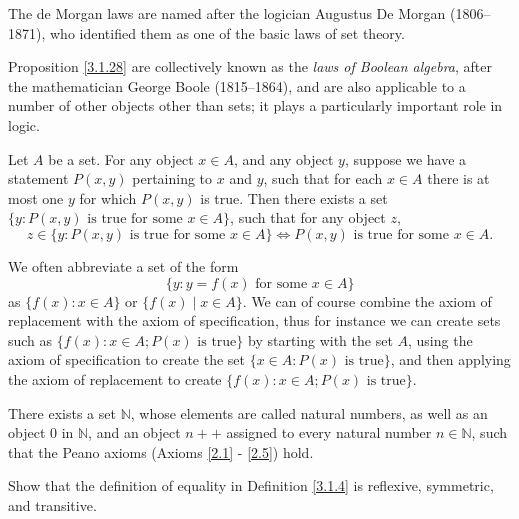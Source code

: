 \begin{remark}\label{3.1.29}
The de Morgan laws are named after the logician Augustus De Morgan (1806--1871), who identified them as one of the basic laws of set theory.
\end{remark}

\begin{remark}\label{3.1.30}
Proposition \ref{3.1.28} are collectively known as the \emph{laws of Boolean algebra}, after the mathematician George Boole (1815–1864), and are also applicable to a number of other objects other than sets;
it plays a particularly important role in logic.
\end{remark}

\begin{axiom}[Replacement]\label{3.6}
Let \(A\) be a set.
For any object \(x \in A\), and any object \(y\), suppose we have a statement \(P(x, y)\) pertaining to \(x\) and \(y\), such that for each \(x \in A\) there is at most one \(y\) for which \(P(x, y)\) is true.
Then there exists a set \(\{y : P(x, y) \text{ is true for some } x \in A\}\), such that for any object \(z\),
\[
    z \in \{y: P(x, y) \text{ is true for some } x \in A\} \iff P(x, y) \text{ is true for some } x \in A.
\]
\end{axiom}

\begin{note}
We often abbreviate a set of the form
\[
    \{y : y = f(x) \text{ for some } x \in A\}
\]
as \(\{f(x) : x \in A\}\) or \(\{f(x) \mid x \in A\}\).
We can of course combine the axiom of replacement with the axiom of specification, thus for instance we can create sets such as \(\{f(x) : x \in A; P(x) \text{ is true}\}\) by starting with the set \(A\), using the axiom of specification to create the set \(\{x \in A : P(x) \text{ is true}\}\), and then applying the axiom of replacement to create \(\{f(x) : x \in A; P(x) \text{ is true}\}\).
\end{note}

\begin{axiom}[Infinity]\label{3.7}
There exists a set \(\mathds{N}\), whose elements are called natural numbers, as well as an object \(0\) in \(\mathds{N}\), and an object \(n++\) assigned to every natural number \(n \in \mathds{N}\), such that the Peano axioms (Axioms \ref{2.1} - \ref{2.5}) hold.
\end{axiom}

\exercisesection

\begin{exercise}\label{ex 3.1.1}
Show that the definition of equality in Definition \ref{3.1.4} is reflexive, symmetric, and transitive.
\end{exercise}

